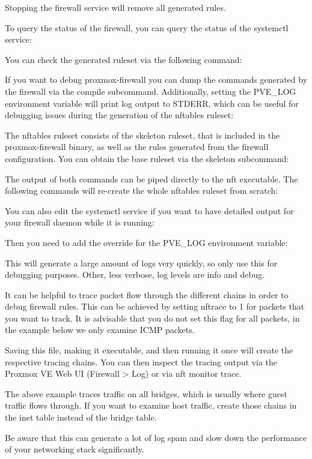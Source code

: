Stopping the firewall service will remove all generated rules.

To query the status of the firewall, you can query the status of the systemctl service:

You can check the generated ruleset via the following command:

If you want to debug proxmox-firewall you can dump the commands generated by the firewall via the compile subcommand. Additionally, setting the PVE_LOG environment variable will print log output to STDERR, which can be useful for debugging issues during the generation of the nftables ruleset:

The nftables ruleset consists of the skeleton ruleset, that is included in the proxmox-firewall binary, as well as the rules generated from the firewall configuration. You can obtain the base ruleset via the skeleton subcommand:

The output of both commands can be piped directly to the nft executable. The following commands will re-create the whole nftables ruleset from scratch:

You can also edit the systemctl service if you want to have detailed output for your firewall daemon while it is running:

Then you need to add the override for the PVE_LOG environment variable:

This will generate a large amount of logs very quickly, so only use this for debugging purposes. Other, less verbose, log levels are info and debug.

It can be helpful to trace packet flow through the different chains in order to debug firewall rules. This can be achieved by setting nftrace to 1 for packets that you want to track. It is advisable that you do not set this flag for all packets, in the example below we only examine ICMP packets.

Saving this file, making it executable, and then running it once will create the respective tracing chains. You can then inspect the tracing output via the Proxmox VE Web UI (Firewall > Log) or via nft monitor trace.

The above example traces traffic on all bridges, which is usually where guest traffic flows through. If you want to examine host traffic, create those chains in the inet table instead of the bridge table.

Be aware that this can generate a lot of log spam and slow down the performance of your networking stack significantly.

